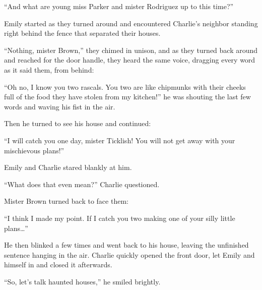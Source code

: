 “And what are young miss Parker and mister Rodriguez up to this time?”

Emily started as they turned around and encountered Charlie’s neighbor standing right behind the fence that separated their houses.

“Nothing, mister Brown,” they chimed in unison, and as they turned back around and  reached for the door handle, they heard the same voice, dragging every word as it said them, from behind:

“Oh no, I know you two rascals. You two are like chipmunks with their cheeks full of the food they have stolen from my kitchen!” he was shouting the last few words and waving his fist in the air.

Then he turned to see his house and continued:

“I will catch you one day, mister Ticklish! You will not get away with your mischievous plans!”

Emily and Charlie stared blankly at him.

“What does that even mean?” Charlie questioned.

Mister Brown turned back to face them:

“I think I made my point. If I catch you two making one of your silly little plans…”

He then blinked a few times and went back to his house, leaving the unfinished sentence hanging in the air. Charlie quickly opened the front door, let Emily and himself in and closed it afterwards.

“So, let’s talk haunted houses,” he smiled brightly.